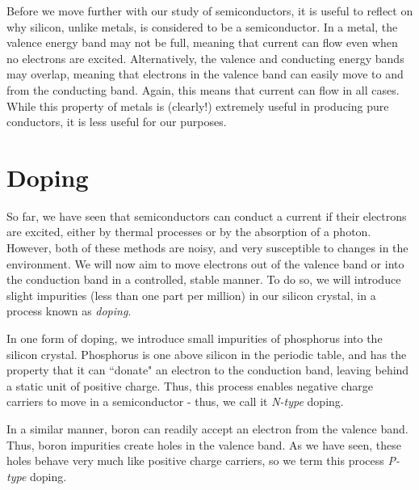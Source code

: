 \documentclass[letterpaper]{article}
\theoremstyle{remark}
\begin{document}
Before we move further with our study of semiconductors, it is useful to reflect on why silicon, unlike metals, is considered to be a semiconductor. In a metal, the valence energy band may not be full, meaning that current can flow even when no electrons are excited. Alternatively, the valence and conducting energy bands may overlap, meaning that electrons in the valence band can easily move to and from the conducting band. Again, this means that current can flow in all cases. While this property of metals is (clearly!) extremely useful in producing pure conductors, it is less useful for our purposes.

\section{Doping}
So far, we have seen that semiconductors can conduct a current if their electrons are excited, either by thermal processes or by the absorption of a photon. However, both of these methods are noisy, and very susceptible to changes in the environment. We will now aim to move electrons out of the valence band or into the conduction band in a controlled, stable manner. To do so, we will introduce slight impurities (less than one part per million) in our silicon crystal, in a process known as \emph{doping}.

In one form of doping, we introduce small impurities of phosphorus into the silicon crystal. Phosphorus is one above silicon in the periodic table, and has the property that it can ``donate" an electron to the conduction band, leaving behind a static unit of positive charge. Thus, this process enables negative charge carriers to move in a semiconductor - thus, we call it \emph{N-type} doping.

In a similar manner, boron can readily accept an electron from the valence band. Thus, boron impurities create holes in the valence band. As we have seen, these holes behave very much like positive charge carriers, so we term this process \emph{P-type} doping.
\end{document}
